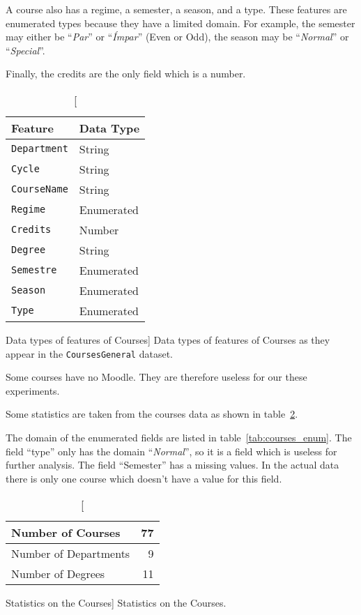 A course also has a regime, a semester, a season, and a type. These features
are enumerated types because they have a limited domain. For example, the
semester may either be ``\textit{Par}'' or ``\textit{Ímpar}'' (Even or Odd),
the season may be ``\textit{Normal}'' or ``\textit{Special}''.

Finally, the credits are the only field which is a number.

\begin{table}[h!]
    \centering

    \begin{tabular}{l l}
        Feature             & Data Type  \\ \hline
        \texttt{Department} & String     \\
        \texttt{Cycle}      & String     \\
        \texttt{CourseName} & String     \\
        \texttt{Regime}     & Enumerated \\
        \texttt{Credits}    & Number     \\
        \texttt{Degree}     & String     \\
        \texttt{Semestre}   & Enumerated \\
        \texttt{Season}     & Enumerated \\
        \texttt{Type}       & Enumerated \\
    \end{tabular}

    \caption
        [Data types of features of Courses]
        {Data types of features of Courses as they appear in the
        \texttt{CoursesGeneral} dataset.}

    \label{tab:courses_general_features}
\end{table}

Some courses have no Moodle. They are therefore useless for our these
experiments.

Some statistics are taken from the courses data as shown in
table~\ref{tab:courses_stats}.

The domain of the enumerated fields are listed in table~\ref{tab:courses_enum}.
The field ``type'' only has the domain ``\textit{Normal}'', so it is a field
which is useless for further analysis. The field ``Semester'' has a missing
values. In the actual data there is only one course which doesn't have a value
for this field.

\begin{table}[h!]
    \centering

    \begin{tabular}{| l | r |}
        \hline
        Number of Courses     & 77 \\ \hline
        Number of Departments & 9  \\ \hline
        Number of Degrees     & 11 \\ \hline
    \end{tabular}

    \caption
        [Statistics on the Courses]
        {Statistics on the Courses.}

    \label{tab:courses_stats}
\end{table}

